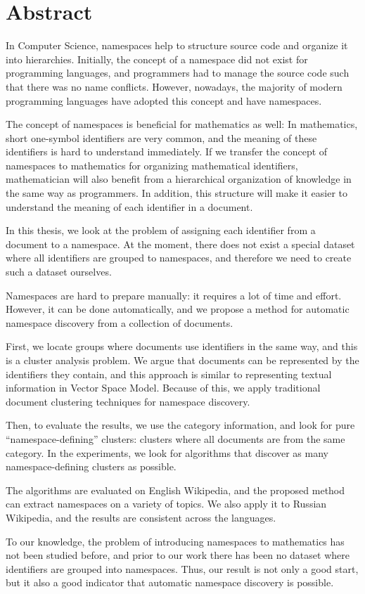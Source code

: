 \section*{Abstract}

In Computer Science, namespaces help to structure source code and
organize it into hierarchies. Initially, the concept of a namespace did not 
exist for programming languages, and programmers had to manage the source code
such that there was no name conflicts. However, nowadays, the majority 
of modern programming languages have adopted this concept and have namespaces. 

The concept of namespaces is beneficial for mathematics as well: 
In mathematics, short one-symbol identifiers are very common, 
and the meaning of these identifiers is hard to understand immediately. 
If we transfer the concept of namespaces to mathematics for organizing mathematical identifiers, 
mathematician will also benefit from a hierarchical organization of 
knowledge in the same way as programmers. In addition, this structure 
will make it easier to understand the meaning of each identifier in a document.


In this thesis, we look at the problem of assigning each identifier from a document 
to a namespace. At the moment, there does not exist a special dataset where 
all identifiers are grouped to namespaces, and therefore we need to create 
such a dataset ourselves.


Namespaces are hard to prepare manually: it requires a lot of time and effort. 
However, it can be done automatically, and we propose 
a method for automatic namespace discovery from a collection of documents. 

First, we locate groups where documents use identifiers in the same way, and this 
is a cluster analysis problem.
We argue that documents can be represented by the identifiers they contain, and this 
approach is similar to representing textual information in Vector Space Model.
Because of this, we apply traditional document clustering techniques for namespace 
discovery.

Then, to evaluate the results, we use the category information, and look for pure 
``namespace-defining'' clusters: clusters where all documents are from the same category. 
In the experiments, we look for algorithms that discover as many namespace-defining 
clusters as possible.

The algorithms are evaluated on English Wikipedia, and the proposed method 
can extract namespaces on a variety of topics. 
We also apply it to Russian Wikipedia, and the results are consistent across 
the languages.

To our knowledge, the problem of introducing namespaces to mathematics has not
been studied before, and prior to our work there has been no dataset where identifiers 
are grouped into namespaces. Thus, our result is not only a good start, 
but it also a good indicator that automatic namespace discovery is possible.